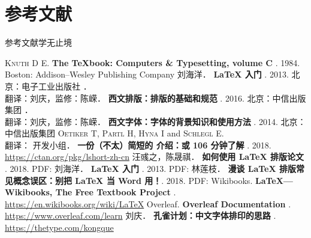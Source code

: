 \documentclass[fontset = adobe, xcolor=svgnames, t, aspectratio=169]{ctexbeamer}
\begin{document}
\section[参考文献]{参考文献}
\begin{frame}[fragile]{参考文献}{学无止境}
\begin{multicols}{2}
\tiny
\newcommand\BOOK[1]{\textbf{#1}}
\newcommand\TAG[1]{\CASE{[#1]}}
\begin{thebibliography}{99}
  \bibitem{}
    \textsc{Knuth D E}.
    \newblock \BOOK{The \TeX book: Computers \& Typesetting, volume C} \TAG{M}. 1984.
    \newblock Boston: Addison--Wesley Publishing Company
  \bibitem{}
    刘海洋．
    \newblock \BOOK{\LaTeX{} 入门} \TAG{M}. 2013.
    \newblock 北京：电子工业出版社
  \bibitem{}
    ．\\
    翻译：刘庆，监修：陈嵘．
    \newblock \BOOK{西文排版：排版的基础和规范} \TAG{M}. 2016.
    \newblock 北京：中信出版集团
  \bibitem{}
    ．\\
    翻译：刘庆，监修：陈嵘．
    \newblock \BOOK{西文字体：字体的背景知识和使用方法} \TAG{M}. 2014.
    \newblock 北京：中信出版集团
  \bibitem{}
    \textsc{Oetiker T}, \textsc{Partl H}, \textsc{Hyna I} and \textsc{Schlegl E}.\\
    翻译：\CTeX{} 开发小组．
    \newblock \BOOK{一份（不太）简短的 \LaTeXe{} 介绍：或 106 分钟了解 \LaTeXe{}} \TAG{EB/OL}. 2018.
    \newblock \url{https://ctan.org/pkg/lshort-zh-cn}
  \bibitem{}
    汪彧之，陈晟祺．
    \newblock \BOOK{如何使用 \LaTeX{} 排版论文} \TAG{EB/OL}. 2018.
    \newblock PDF:
      \href{https://github.com/tuna/thulib-latex-talk/raw/master/latex-talk.pdf}{\faDownload}
  \bibitem{}
    刘海洋．
    \newblock \BOOK{\LaTeX{} 入门} \TAG{EB/OL}. 2013.
    \newblock PDF:
      \href{https://bbs.pku.edu.cn/attach/e7/f2/e7f2bb698b9c3672/tex_intro_talk.pdf}{\faDownload}
  \bibitem{}
    林莲枝．
    \newblock \BOOK{漫谈 \LaTeX{} 排版常见概念误区：别把 \LaTeX{} 当 Word 用！}\TAG{EB/OL}. 2018.
    \newblock PDF:
      \href{http://static.latexstudio.net/wp-content/uploads/2018/03/LianTze-presentation-0320-forReading.pdf}{\faDownload}
  \bibitem{}
    Wikibooks.
    \newblock \BOOK{\LaTeX{}---Wikibooks, The Free Textbook Project} \TAG{EB/OL}.
    \newblock \url{https://en.wikibooks.org/wiki/LaTeX}
  \bibitem{}
    Overleaf.
    \newblock \BOOK{Overleaf Documentation} \TAG{EB/OL}.
    \newblock \url{https://www.overleaf.com/learn}
  \bibitem{}
    刘庆．
    \newblock \BOOK{孔雀计划：中文字体排印的思路} \TAG{EB/OL}.
    \newblock \url{https://thetype.com/kongque}
\end{thebibliography}
\end{multicols}
\end{frame}
\end{document}
